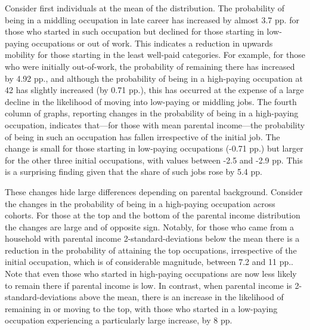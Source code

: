 Consider first individuals at the mean of the distribution. The probability of being in a middling occupation in late career has increased by almost 3.7 pp. for those who started in such occupation but declined for those starting in low-paying occupations or out of work. This indicates a reduction in upwards mobility for those starting in the least well-paid categories. For example, for those who were initially out-of-work, the probability of remaining there has increased by 4.92 pp., and although the probability of being in a high-paying occupation at 42 has slightly increased (by 0.71 pp.), this has occurred at the expense of a large decline in the likelihood of moving into low-paying or middling jobs. The fourth column of graphs, reporting changes in the probability of being in a high-paying occupation, indicates that---for those with mean parental income---the probability of being in such an occupation has fallen irrespective of the initial job. The change is small for those starting in low-paying occupations (-0.71 pp.) but larger for the other three initial occupations, with values between -2.5 and -2.9 pp. This is a surprising finding given that the share of such jobs rose by 5.4 pp.

These changes hide large differences depending on parental background. Consider the changes in the probability of being in a high-paying occupation across cohorts. For those at the top and the bottom of the parental income distribution the changes are large and of opposite sign. Notably, for those who came from a household with parental income 2-standard-deviations below the mean there is a reduction in the probability of attaining the top occupations, irrespective of the initial occupation, which is of considerable magnitude, between 7.2 and 11 pp.. Note that even those who started in high-paying occupations are now less likely to remain there if parental income is low. In contrast, when parental income is 2-standard-deviations above the mean, there is an increase in the likelihood of remaining in or moving to the top, with those who started in a low-paying occupation experiencing a particularly large increase, by 8 pp. 

